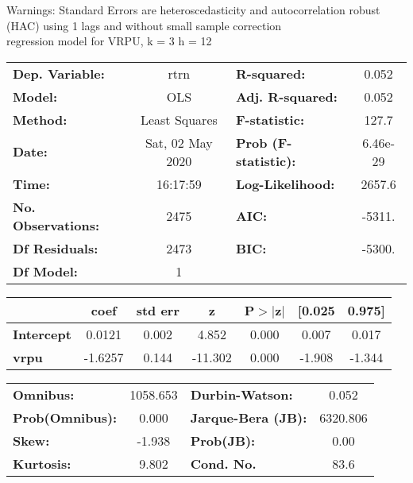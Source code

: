Warnings: \newline
 [1] Standard Errors are heteroscedasticity and autocorrelation robust (HAC) using 1 lags and without small sample correction\\ 

regression model for VRPU, k = 3 h = 12\begin{center}
\begin{tabular}{lclc}
\toprule
\textbf{Dep. Variable:}    &       rtrn       & \textbf{  R-squared:         } &     0.052   \\
\textbf{Model:}            &       OLS        & \textbf{  Adj. R-squared:    } &     0.052   \\
\textbf{Method:}           &  Least Squares   & \textbf{  F-statistic:       } &     127.7   \\
\textbf{Date:}             & Sat, 02 May 2020 & \textbf{  Prob (F-statistic):} &  6.46e-29   \\
\textbf{Time:}             &     16:17:59     & \textbf{  Log-Likelihood:    } &    2657.6   \\
\textbf{No. Observations:} &        2475      & \textbf{  AIC:               } &    -5311.   \\
\textbf{Df Residuals:}     &        2473      & \textbf{  BIC:               } &    -5300.   \\
\textbf{Df Model:}         &           1      & \textbf{                     } &             \\
\bottomrule
\end{tabular}
\begin{tabular}{lcccccc}
                   & \textbf{coef} & \textbf{std err} & \textbf{z} & \textbf{P$> |$z$|$} & \textbf{[0.025} & \textbf{0.975]}  \\
\midrule
\textbf{Intercept} &       0.0121  &        0.002     &     4.852  &         0.000        &        0.007    &        0.017     \\
\textbf{vrpu}      &      -1.6257  &        0.144     &   -11.302  &         0.000        &       -1.908    &       -1.344     \\
\bottomrule
\end{tabular}
\begin{tabular}{lclc}
\textbf{Omnibus:}       & 1058.653 & \textbf{  Durbin-Watson:     } &    0.052  \\
\textbf{Prob(Omnibus):} &   0.000  & \textbf{  Jarque-Bera (JB):  } & 6320.806  \\
\textbf{Skew:}          &  -1.938  & \textbf{  Prob(JB):          } &     0.00  \\
\textbf{Kurtosis:}      &   9.802  & \textbf{  Cond. No.          } &     83.6  \\
\bottomrule
\end{tabular}
\end{center}

